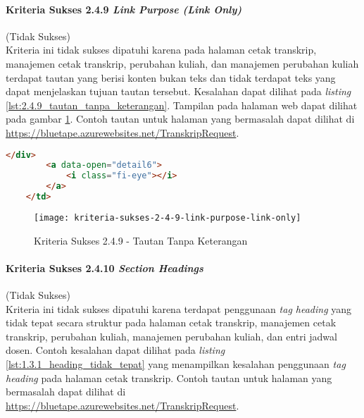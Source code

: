 \paragraph{Kriteria Sukses 2.4.9 \textit{Link Purpose (Link Only)}}
\label{par:kepatuhan_bluetape_kriteria_sukses_2.4.9}
(Tidak Sukses)\\

Kriteria ini tidak sukses dipatuhi karena pada halaman cetak transkrip, manajemen cetak transkrip, perubahan kuliah, dan manajemen perubahan kuliah terdapat tautan yang berisi konten bukan teks dan tidak terdapat teks yang dapat menjelaskan tujuan tautan tersebut. Kesalahan dapat dilihat pada \textit{listing} \ref{lst:2.4.9_tautan_tanpa_keterangan}. Tampilan pada halaman web dapat dilihat pada gambar \ref{fig:2.4.9_link_purpose_link_only}. Contoh tautan untuk halaman yang bermasalah dapat dilihat di \url{https://bluetape.azurewebsites.net/TranskripRequest}.

\begin{lstlisting}[frame=single, label={lst:2.4.9_tautan_tanpa_keterangan}, language=HTML, caption=Kriteria Sukses 2.4.9 - Tautan Tanpa Keterangan]
        </div>
        <a data-open="detail6">
            <i class="fi-eye"></i>
        </a>
    </td>
\end{lstlisting}

\begin{figure}[H]
    \centering  
    \texttt{[image: kriteria-sukses-2-4-9-link-purpose-link-only]}  
    \caption[Kriteria Sukses 2.4.9 - Tautan Tanpa Keterangan]{Kriteria Sukses 2.4.9 - Tautan Tanpa Keterangan}
    \label{fig:2.4.9_link_purpose_link_only}  
\end{figure} 

\paragraph{Kriteria Sukses 2.4.10 \textit{Section Headings}}
\label{par:kepatuhan_bluetape_kriteria_sukses_2.4.10}
(Tidak Sukses)\\

Kriteria ini tidak sukses dipatuhi karena terdapat penggunaan \textit{tag heading} yang tidak tepat secara struktur pada halaman cetak transkrip, manajemen cetak transkrip, perubahan kuliah, manajemen perubahan kuliah, dan entri jadwal dosen. Contoh kesalahan dapat dilihat pada \textit{listing} \ref{lst:1.3.1_heading_tidak_tepat} yang menampilkan kesalahan penggunaan \textit{tag heading} pada halaman cetak transkrip. Contoh tautan untuk halaman yang bermasalah dapat dilihat di \url{https://bluetape.azurewebsites.net/TranskripRequest}.

